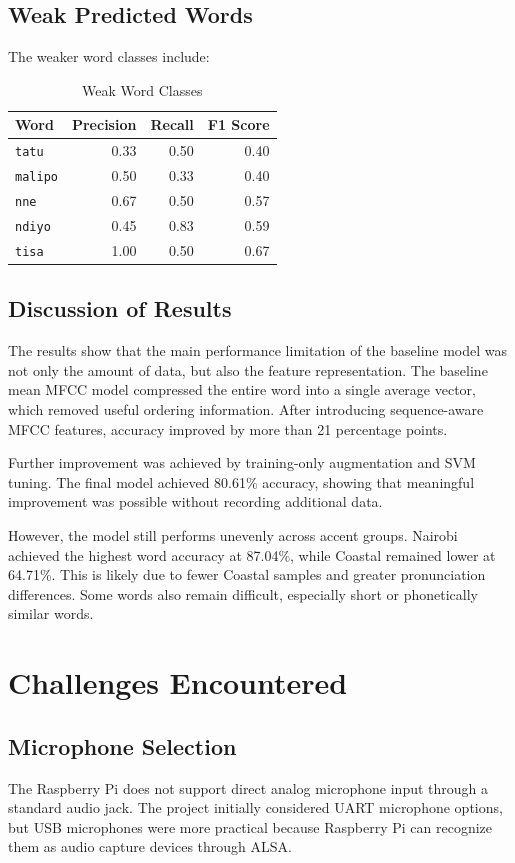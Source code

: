 \documentclass[12pt,a4paper]{report}
\begin{document}
\section{Weak Predicted Words}
The weaker word classes include:

\begin{table}[h]
\centering
\caption{Weak Word Classes}
\begin{tabular}{lrrr}
\toprule
\textbf{Word} & \textbf{Precision} & \textbf{Recall} & \textbf{F1 Score} \\
\midrule
\texttt{tatu} & 0.33 & 0.50 & 0.40 \\
\texttt{malipo} & 0.50 & 0.33 & 0.40 \\
\texttt{nne} & 0.67 & 0.50 & 0.57 \\
\texttt{ndiyo} & 0.45 & 0.83 & 0.59 \\
\texttt{tisa} & 1.00 & 0.50 & 0.67 \\
\bottomrule
\end{tabular}
\end{table}

\section{Discussion of Results}
The results show that the main performance limitation of the baseline model was not only the amount of data, but also the feature representation. The baseline mean MFCC model compressed the entire word into a single average vector, which removed useful ordering information. After introducing sequence-aware MFCC features, accuracy improved by more than 21 percentage points.

Further improvement was achieved by training-only augmentation and SVM tuning. The final model achieved 80.61\% accuracy, showing that meaningful improvement was possible without recording additional data.

However, the model still performs unevenly across accent groups. Nairobi achieved the highest word accuracy at 87.04\%, while Coastal remained lower at 64.71\%. This is likely due to fewer Coastal samples and greater pronunciation differences. Some words also remain difficult, especially short or phonetically similar words.

\chapter{Challenges Encountered}

\section{Microphone Selection}
The Raspberry Pi does not support direct analog microphone input through a standard audio jack. The project initially considered UART microphone options, but USB microphones were more practical because Raspberry Pi can recognize them as audio capture devices through ALSA.
\end{document}
